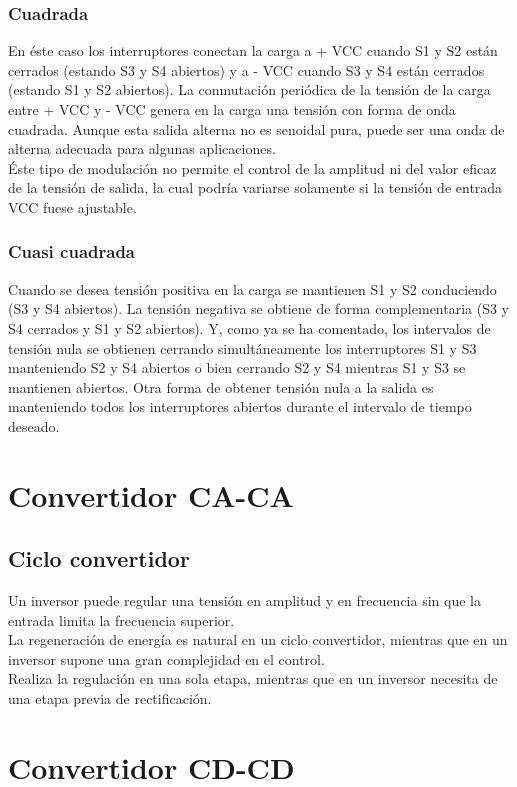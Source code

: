 \documentclass[12pt,a4paper]{article}
\begin{document}
\subsubsection{Cuadrada}
En éste caso los interruptores conectan la carga a + VCC cuando S1 y S2 están cerrados (estando S3 y S4 abiertos) y a - VCC cuando S3 y S4 están cerrados (estando S1 y S2 abiertos). La conmutación periódica de la tensión de la carga entre + VCC y - VCC genera en la carga una tensión con forma de onda cuadrada. Aunque esta salida alterna no es senoidal pura, puede ser una onda de alterna adecuada para algunas aplicaciones.\\
Éste tipo de modulación no permite el control de la amplitud ni del valor eficaz de la tensión de salida, la cual podría variarse solamente si la tensión de entrada VCC fuese ajustable.

\subsubsection{Cuasi cuadrada}
Cuando se desea tensión positiva en la carga se mantienen S1 y S2 conduciendo (S3 y S4 abiertos). La tensión negativa se obtiene de forma complementaria (S3 y S4 cerrados y S1 y S2 abiertos). Y, como ya se ha comentado, los intervalos de tensión nula se obtienen cerrando simultáneamente los interruptores S1 y S3 manteniendo S2 y S4 abiertos o bien cerrando S2 y S4 mientras S1 y S3 se mantienen abiertos. Otra forma de obtener tensión nula a la salida es manteniendo todos los interruptores abiertos durante el intervalo de tiempo deseado.

\section{Convertidor CA-CA}
\subsection{Ciclo convertidor}
Un inversor puede regular una tensión en amplitud y en frecuencia sin que la entrada limita la frecuencia superior.\\
La regeneración de energía es natural en un ciclo convertidor, mientras que en un inversor supone una gran complejidad en el control.\\
Realiza la regulación en una sola etapa, mientras que en un inversor necesita de una etapa previa de rectificación.

\section{Convertidor CD-CD}
\end{document}
